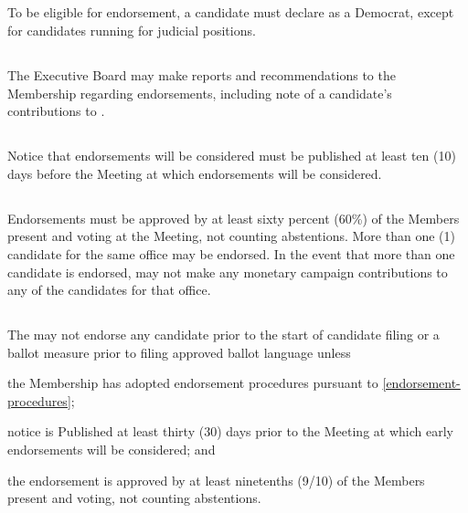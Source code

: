 \subsection{}
To be eligible for endorsement, a candidate must declare as a Democrat, except for candidates running for judicial positions.

\subsection{}
The Executive Board may make reports and recommendations to the Membership regarding endorsements, including note of a candidate’s contributions to \thedistrict{}.

\subsection{}
Notice that endorsements will be considered must be published at least ten (10) days before the Meeting at which endorsements will be considered.

\subsection{}
Endorsements must be approved by at least sixty percent (60\%) of the Members present and voting at the Meeting, not counting abstentions. More than one (1) candidate for the same office may be endorsed. In the event that more than one candidate is endorsed, \thedistrict{} may not make any monetary campaign contributions to any of the candidates for that office.

\subsection{}
The \district{} may not endorse any candidate prior to the start of candidate filing or a ballot measure prior to filing approved ballot language unless
\begin{inlinealphalist}
    \item the Membership has adopted endorsement procedures pursuant to \autoref{endorsement-procedures};
    \item notice is Published at least thirty (30) days prior to the Meeting at which early endorsements will be considered; and
    \item the endorsement is approved by at least ninetenths (9/10) of the Members present and voting, not counting abstentions.
\end{inlinealphalist}

